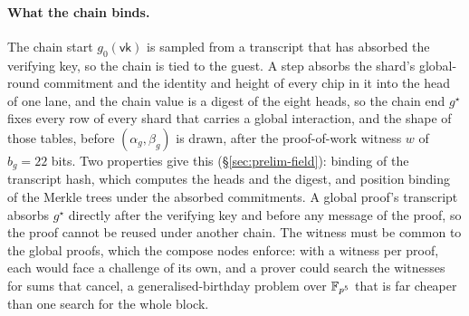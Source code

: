 \paragraph{What the chain binds.} The chain start $g_0(\mathsf{vk})$ is sampled from a transcript that has absorbed the verifying key, so the chain is tied to the guest. A step absorbs the shard's global-round commitment and the identity and height of every chip in it into the head of one lane, and the chain value is a digest of the eight heads, so the chain end $g^\star$ fixes every row of every shard that carries a global interaction, and the shape of those tables, before $(\alpha_g, \beta_g)$ is drawn, after the proof-of-work witness $w$ of $b_g = 22$ bits. Two properties give this (\S\ref{sec:prelim-field}): binding of the transcript hash, which computes the heads and the digest, and position binding of the Merkle trees under the absorbed commitments. A global proof's transcript absorbs $g^\star$ directly after the verifying key and before any message of the proof, so the proof cannot be reused under another chain. The witness must be common to the global proofs, which the compose nodes enforce: with a witness per proof, each would face a challenge of its own, and a prover could search the witnesses for sums that cancel, a generalised-birthday problem over $\mathbb{F}_{p^5}$ that is far cheaper than one search for the whole block.

